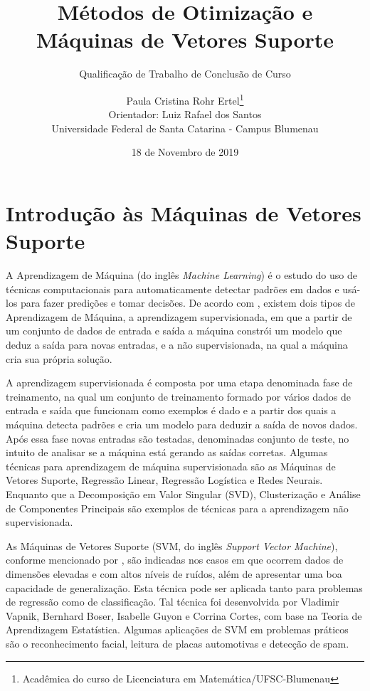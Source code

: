 \documentclass[12pt,a4paper]{scrartcl}
\theoremstyle{definition}%
\begin{document}
\title{Métodos de Otimização e Máquinas de Vetores Suporte} 
\author{ \normalfont Paula Cristina Rohr Ertel\thanks{Acadêmica do curso de Licenciatura em Matemática/UFSC-Blumenau} \\ \small Orientador: Luiz Rafael dos Santos \\ \small Universidade Federal de Santa Catarina - Campus Blumenau}
\date{\small 18 de Novembro de 2019}
\subtitle{Qualificação de Trabalho de Conclusão de Curso}
\maketitle

\section{Introdução às Máquinas de Vetores Suporte}

A Aprendizagem de Máquina (do inglês \textit{Machine Learning}) é o estudo do uso de técnicas computacionais para automaticamente detectar padrões em dados e usá-los para fazer predições e tomar decisões. De acordo com \textcite{Evelin2017}, existem dois tipos de Aprendizagem de Máquina, a aprendizagem supervisionada, em que a partir de um conjunto de dados de entrada e saída a máquina constrói um modelo que deduz a saída para novas entradas, e a não supervisionada, na qual a máquina cria sua própria solução. 

A aprendizagem supervisionada é composta por uma etapa denominada fase de treinamento, na qual um conjunto de treinamento formado por vários dados de entrada e saída que funcionam como exemplos é dado e a partir dos quais a máquina detecta padrões e cria um modelo para deduzir a saída de novos dados. Após essa fase novas entradas são testadas, denominadas conjunto de teste, no intuito de analisar se a máquina está gerando as saídas corretas. Algumas técnicas para aprendizagem de máquina supervisionada são as Máquinas de Vetores Suporte, Regressão Linear, Regressão Logística e Redes Neurais. Enquanto que a Decomposição em Valor Singular (SVD), Clusterização e Análise de Componentes Principais \cite{Evelin2017} são exemplos de técnicas para a aprendizagem não supervisionada. 

As Máquinas de Vetores Suporte (SVM, do inglês \textit{Support Vector Machine}), conforme mencionado por \textcite{Evelin2017}, são indicadas nos casos em que ocorrem dados de dimensões elevadas e com altos níveis de ruídos, além de apresentar uma boa capacidade de generalização. Esta técnica pode ser aplicada tanto para problemas de regressão como de classificação. Tal técnica foi desenvolvida por Vladimir Vapnik, Bernhard Boser, Isabelle Guyon e Corrina Cortes, com base na Teoria de Aprendizagem Estatística. Algumas aplicações de SVM em problemas práticos são o reconhecimento facial, leitura de placas automotivas e detecção de spam.
\end{document}
